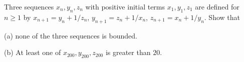 Three sequences $x_n, y_n, z_n$ with positive initial terms $x_1, y_1, z_1$ are defined for $n \geq 1$ by $x_{n+1} = y_n + 1/z_n$, $y_{n+1} = z_n + 1/x_n$, $z_{n+1} = x_n + 1/y_n$. Show that

(a) none of the three sequences is bounded.

(b) At least one of $x_{200}, y_{200}, z_{200}$ is greater than $20$.
